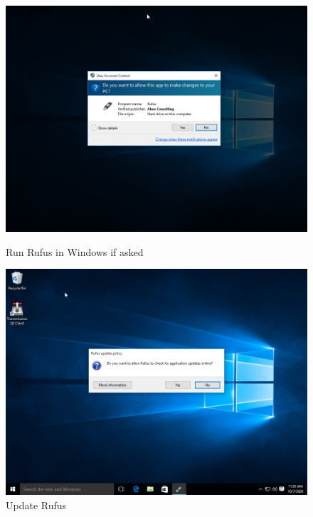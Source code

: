 \documentclass{article}
\begin{document}
\begin{figure}[ht!]
    \centering
    \begin{minipage}{0.5\textwidth}
        \includegraphics[width=.95\textwidth]{images/allow_rufus_to_run_if_asked.png}
        \caption{Run Rufus in Windows if asked}
        \label{fig:runRufus}
    \end{minipage}\hfill
    \centering
    \begin{minipage}{0.5\textwidth}
        \includegraphics[width=.95\linewidth]{images/allow_rufus_to_check_for_updates_if_you_want.png}
        \caption{Update Rufus}
        \label{fig:updateRufus}
    \end{minipage}\hfill
    \centering
    \begin{minipage}{0.5\textwidth}

\end{minipage}
\end{figure}
\end{document}
